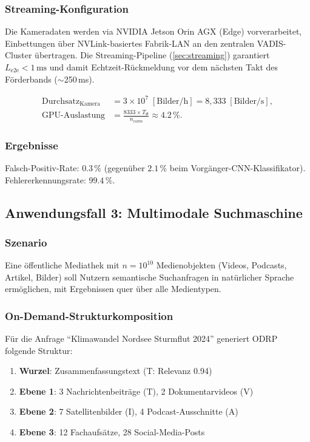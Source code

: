 ﻿\documentclass[12pt,a4paper]{article}
\begin{document}
\subsubsection{Streaming-Konfiguration}
Die Kameradaten werden via NVIDIA Jetson Orin AGX (Edge)
vorverarbeitet, Einbettungen über NVLink-basiertes Fabrik-LAN
an den zentralen VADIS-Cluster übertragen. Die Streaming-Pipeline
(\cref{sec:streaming}) garantiert $L_{\text{e2e}} < 1\,\mathrm{ms}$
und damit Echtzeit-Rückmeldung vor dem nächsten Takt des
Förderbands ($\sim$250\,ms).

\begin{align}
  \text{Durchsatz}_{\text{Kamera}} &= 3 \times 10^7 \;[\text{Bilder/h}]
    = 8{,}333 \;[\text{Bilder/s}], \\
  \text{GPU-Auslastung} &= \frac{8333 \times T_\Phi}{n_{\text{cores}}}
    \approx 4.2\,\%.
\end{align}

\subsubsection{Ergebnisse}
Falsch-Positiv-Rate: $0.3\,\%$ (gegenüber $2.1\,\%$ beim
Vorgänger-CNN-Klassifikator). Fehler\-erkennungsrate: $99.4\,\%$.

\subsection{Anwendungsfall 3: Multimodale Suchmaschine}

\subsubsection{Szenario}
Eine öffentliche Mediathek mit $n = 10^{10}$ Medienobjekten
(Videos, Podcasts, Artikel, Bilder) soll Nutzern semantische
Suchanfragen in natürlicher Sprache ermöglichen, mit Ergebnissen
quer über alle Medientypen.

\subsubsection{On-Demand-Strukturkomposition}
Für die Anfrage ``Klimawandel Nordsee Sturmflut 2024''
generiert ODRP folgende Struktur:

\begin{enumerate}[leftmargin=1.2em, itemsep=1pt]
  \item \textbf{Wurzel}: Zusammenfassungstext (T: Relevanz 0.94)
  \item \textbf{Ebene 1}: 3 Nachrichtenbeiträge (T), 2 Dokumentarvideos (V)
  \item \textbf{Ebene 2}: 7 Satellitenbilder (I), 4 Podcast-Ausschnitte (A)
  \item \textbf{Ebene 3}: 12 Fachaufsätze, 28 Social-Media-Posts
\end{enumerate}
\end{document}
